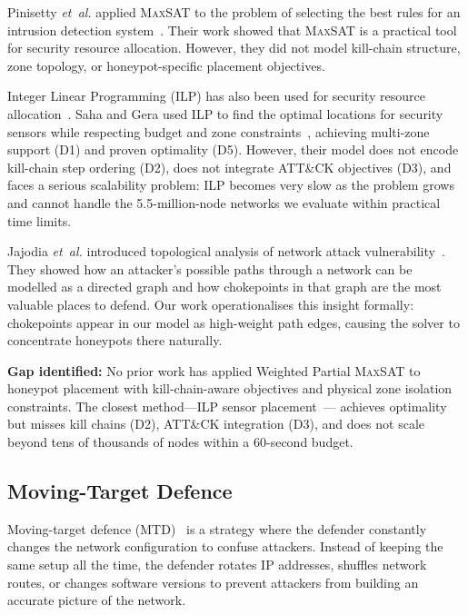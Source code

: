 \documentclass[journal]{IEEEtran}
\newcommand{\etal}{\emph{et~al.}}
\newcommand{\maxsat}{\textsc{MaxSAT}}
\begin{document}
Pinisetty \etal{} applied \maxsat{} to the problem of
selecting the best rules for an intrusion detection
system~\cite{pinisetty2017}.
Their work showed that \maxsat{} is a practical tool for
security resource allocation.
However, they did not model kill-chain structure, zone
topology, or honeypot-specific placement objectives.

Integer Linear Programming (ILP) has also been used for
security resource allocation~\cite{saha2015,bozorgi2010}.
Saha and Gera used ILP to find the optimal locations for
security sensors while respecting budget and zone
constraints~\cite{saha2015}, achieving multi-zone support
(D1) and proven optimality (D5).
However, their model does not encode kill-chain step
ordering (D2), does not integrate ATT\&CK objectives (D3),
and faces a serious scalability problem: ILP becomes very slow
as the problem grows and cannot handle the 5.5-million-node
networks we evaluate within practical time limits.

Jajodia \etal{} introduced topological analysis of network
attack vulnerability~\cite{jajodia2005}.
They showed how an attacker's possible paths through a network
can be modelled as a directed graph and how chokepoints in
that graph are the most valuable places to defend.
Our work operationalises this insight formally: chokepoints
appear in our model as high-weight path edges, causing the
solver to concentrate honeypots there naturally.

\textbf{Gap identified:} No prior work has applied Weighted
Partial \maxsat{} to honeypot placement with kill-chain-aware
objectives and physical zone isolation constraints.
The closest method---ILP sensor placement~\cite{saha2015}---
achieves optimality but misses kill chains (D2), ATT\&CK
integration (D3), and does not scale beyond tens of thousands
of nodes within a 60-second budget.

\subsection{Moving-Target Defence}

Moving-target defence (MTD)~\cite{zhu2013} is a strategy
where the defender constantly changes the network
configuration to confuse attackers.
Instead of keeping the same setup all the time, the defender
rotates IP addresses, shuffles network routes, or changes
software versions to prevent attackers from building an
accurate picture of the network.
\end{document}
